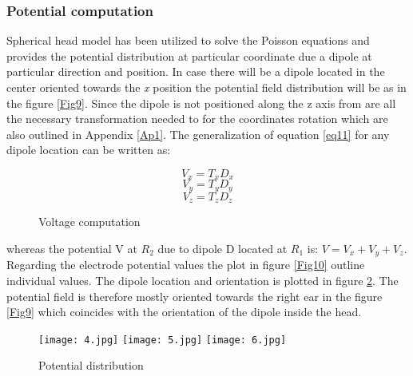 \subsubsection{Potential computation}

Spherical head model has been utilized to solve the Poisson equations and provides the potential distribution at particular coordinate due a dipole at particular direction and position. In case there will be a dipole located in the center oriented towards the \textit{x} position the potential field distribution will be as in the figure \ref{Fig9}. Since the dipole is not positioned along the z axis from \cite{2} are all the necessary transformation needed to for the coordinates rotation which are also outlined in Appendix \ref{Ap1}. The generalization of equation \ref{eq11} for any dipole location can be written as:


\begin{figure}[!htbp]
%
    \centering
\begin{equation}\label{ldf1}
    V_{x}=T_{x}D_{x}
\end{equation}
\endminipage\hfill
{}%
    \centering
\begin{equation}\label{ldf2}
    V_{y}=T_{y}D_{y}
\end{equation}
\endminipage\hfill
{}%
    \centering
\begin{equation}\label{ldf3}
    V_{z}=T_{z}D_{z}
\end{equation}
\endminipage\hfill
\caption{Voltage computation}\label{new_label1}
\end{figure}

whereas the potential V at $R_{2}$ due to dipole D located at $R_{1}$ is: $V=V_{x}+V_{y}+V_{z}$. Regarding the electrode potential values the plot in figure \ref{Fig10} outline individual values. The dipole location and orientation is plotted in figure \ref{Fig11}. The potential field is therefore mostly oriented towards the right ear in the figure \ref{Fig9} which coincides with the orientation of the dipole inside the head. 

\begin{figure}[!htbp]
%
    \centering
    \texttt{[image: 4.jpg]}
    \label{Fig9}
\endminipage\hfill
{}%
    \centering
    \texttt{[image: 5.jpg]}
    \label{Fig10}
\endminipage\hfill
{}%
    \centering
    \texttt{[image: 6.jpg]}
    \label{Fig11}
\endminipage\hfill
\caption{Potential distribution}
\end{figure}

